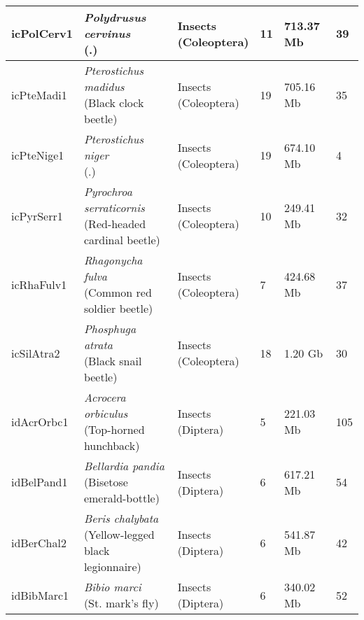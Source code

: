 \begin{centering}
\begin{longtable}{l|l|l|l|l|l}
icPolCerv1 & \makecell[{l}]{\textit{Polydrusus cervinus} \\ (.)} & \makecell[{l}]{Insects \\ (Coleoptera)} & 11 & 713.37 Mb & 39  \\ \hline
icPteMadi1 & \makecell[{l}]{\textit{Pterostichus madidus} \\ (Black clock beetle)} & \makecell[{l}]{Insects \\ (Coleoptera)} & 19 & 705.16 Mb & 35  \\ \hline
icPteNige1 & \makecell[{l}]{\textit{Pterostichus niger} \\ (.)} & \makecell[{l}]{Insects \\ (Coleoptera)} & 19 & 674.10 Mb & 4  \\ \hline
icPyrSerr1 & \makecell[{l}]{\textit{Pyrochroa serraticornis} \\ (Red-headed cardinal beetle)} & \makecell[{l}]{Insects \\ (Coleoptera)} & 10 & 249.41 Mb & 32  \\ \hline
icRhaFulv1 & \makecell[{l}]{\textit{Rhagonycha fulva} \\ (Common red soldier beetle)} & \makecell[{l}]{Insects \\ (Coleoptera)} & 7 & 424.68 Mb & 37  \\ \hline
icSilAtra2 & \makecell[{l}]{\textit{Phosphuga atrata} \\ (Black snail beetle)} & \makecell[{l}]{Insects \\ (Coleoptera)} & 18 & 1.20 Gb & 30  \\ \hline
idAcrOrbc1 & \makecell[{l}]{\textit{Acrocera orbiculus} \\ (Top-horned hunchback)} & \makecell[{l}]{Insects \\ (Diptera)} & 5 & 221.03 Mb & 105  \\ \hline
idBelPand1 & \makecell[{l}]{\textit{Bellardia pandia} \\ (Bisetose emerald-bottle)} & \makecell[{l}]{Insects \\ (Diptera)} & 6 & 617.21 Mb & 54  \\ \hline
idBerChal2 & \makecell[{l}]{\textit{Beris chalybata} \\ (Yellow-legged black legionnaire)} & \makecell[{l}]{Insects \\ (Diptera)} & 6 & 541.87 Mb & 42  \\ \hline
idBibMarc1 & \makecell[{l}]{\textit{Bibio marci} \\ (St. mark's fly)} & \makecell[{l}]{Insects \\ (Diptera)} & 6 & 340.02 Mb & 52  \\ \hline

\end{longtable}
\end{centering}
